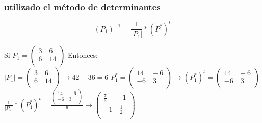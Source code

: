 \documentclass[
	11pt, %
]{beamer}
\begin{document}
\begin{frame}
  \frametitle{utilizado el método de determinantes}

  \[(P_{1})^{-1} = \frac{1}{|P_{1}|}*(P_{1}^{*})^{t}\]

  Si $P_{1} = \begin{pmatrix}
    3 \quad 6\\
    6 \quad 14\\
  \end{pmatrix}$ Entonces:\\
  $|P_{1}|= \begin{pmatrix}
    3 \quad 6\\
    6 \quad 14\\
  \end{pmatrix} \rightarrow 42-36=6$
  $P_{1}^{*} = \begin{pmatrix}
    14 \quad -6\\
    -6 \quad  3\\
  \end{pmatrix} \rightarrow (P_{1}^{*})^{t} = \begin{pmatrix}
    14 \quad -6\\
    -6 \quad  3\\
    \end{pmatrix}$
  $\frac{1}{|P_{1}|}*(P_{1}^{*})^{t} = \frac{\begin{pmatrix} 14 \quad -6\\-6 \quad 3\\ \end{pmatrix}}{6} \rightarrow \begin{pmatrix} \frac{7}{3} \quad -1\\
    -1 \quad \frac{1}{2}\\
  \end{pmatrix}$ 
\end{frame}
\end{document}
